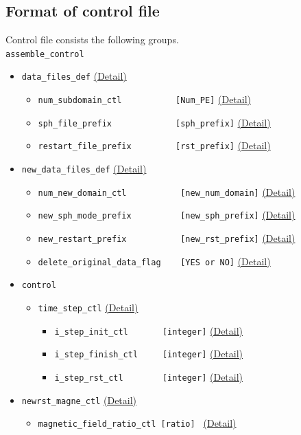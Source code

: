 \subsection{Format of control file}
Control file consists the following groups. \\
%
\verb|assemble_control| \label{href_i:assemble_control}
\begin{itemize}
\item \verb|data_files_def|
	\hyperref[href_t:data_files_def]{(Detail)}
	\begin{itemize}
	\item \verb|num_subdomain_ctl           [Num_PE]|
		\hyperref[href_t:num_subdomain_ctl]{(Detail)}
	\item \verb|sph_file_prefix             [sph_prefix]|
    		\hyperref[href_t:sph_file_prefix]{(Detail)}
	\item \verb|restart_file_prefix         [rst_prefix]|
    		\hyperref[href_t:restart_file_prefix]{(Detail)}
	\end{itemize}
%
\item \verb|new_data_files_def|
	\label{href_i:new_data_files_def}
	\hyperref[href_t:new_data_files_def]{(Detail)}
	\begin{itemize}
	\item \verb|num_new_domain_ctl           [new_num_domain]|
		\hyperref[href_t:num_new_domain_ctl]{(Detail)}
	\item \verb|new_sph_mode_prefix          [new_sph_prefix]|
    		\hyperref[href_t:new_sph_mode_prefix]{(Detail)}
	\item \verb|new_restart_prefix           [new_rst_prefix]|
    		\hyperref[href_t:new_restart_prefix]{(Detail)}
	\item \verb|delete_original_data_flag    [YES or NO]|
    		\hyperref[href_t:delete_original_data_flag]{(Detail)}
	\end{itemize}
%
\item \verb|control|
	\begin{itemize}
	\item \verb|time_step_ctl|
		\label{href_i:time_step_ctl2}
    		\hyperref[href_t:time_step_ctl]{(Detail)}
		\begin{itemize}
		\item \verb|i_step_init_ctl       [integer]|
	    		\hyperref[href_t:i_step_init_ctl]{(Detail)}
		\item \verb|i_step_finish_ctl     [integer]|
	    		\hyperref[href_t:i_step_finish_ctl]{(Detail)}
		\item \verb|i_step_rst_ctl        [integer]|
	    		\hyperref[href_t:i_step_rst_ctl]{(Detail)}
		\end{itemize}
	\end{itemize}
%
\item \verb|newrst_magne_ctl|
	\label{href_i:newrst_magne_ctl}
	\hyperref[href_t:newrst_magne_ctl]{(Detail)}
	\begin{itemize}
	\item \verb|magnetic_field_ratio_ctl [ratio] |
    		\hyperref[href_t:magnetic_field_ratio_ctl]{(Detail)}
	\end{itemize}
\end{itemize}

